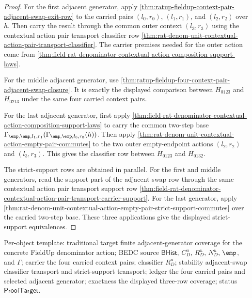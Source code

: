 \begin{proof}
For the first adjacent generator, apply
\autoref{thm:ratup-fieldup-context-pair-adjacent-swap-exit-row} to the carried
pairs $(l_0,r_0)$, $(l_1,r_1)$, and $(l_2,r_2)$ over $h$. Then carry the
result through the common outer context $(l_3,r_3)$ using the contextual action
pair transport classifier row
\autoref{thm:rat-denom-unit-contextual-action-pair-transport-classifier}. The
carrier premises needed for the outer action come from
\autoref{thm:field-rat-denominator-contextual-action-composition-support-laws}.

For the middle adjacent generator, use
\autoref{thm:ratup-fieldup-four-context-pair-adjacent-swap-closure}. It is
exactly the displayed comparison between $H_{0123}$ and $H_{0213}$ under the
same four carried context pairs.

For the last adjacent generator, first apply
\autoref{thm:field-rat-denominator-contextual-action-composition-support-laws}
to carry the common two-step base
$\Gamma_{\emp,\emp,l_1,r_1}(\Gamma_{\emp,\emp,l_0,r_0}(h))$. Then apply
\autoref{thm:rat-denom-unit-contextual-action-empty-pair-commutes} to the two
outer empty-endpoint actions $(l_2,r_2)$ and $(l_3,r_3)$. This gives the
classifier row between $H_{0123}$ and $H_{0132}$.

The strict-support rows are obtained in parallel. For the first and middle
generators, read the support part of the adjacent-swap row through the same
contextual action pair transport support row
\autoref{thm:field-rat-denominator-contextual-action-pair-transport-carrier-support}.
For the last generator, apply
\autoref{thm:rat-denom-unit-contextual-action-empty-pair-strict-support-commutes}
over the carried two-step base. These three applications give the displayed
strict-support equivalences.
\end{proof}

Per-object template: traditional target finite adjacent-generator coverage for
the concrete FieldUp denominator action; BEDC source $\mathsf{BHist}$, $C_D^u$,
$R_D^u$, $N_D^u$, $\emp$, and $\Gamma$; carrier the four carried context pairs;
classifier $R_D^u$; stability adjacent-swap classifier transport and
strict-support transport; ledger the four carried pairs and selected adjacent
generator; exactness the displayed three-row coverage; status
$\mathsf{ProofTarget}$.

